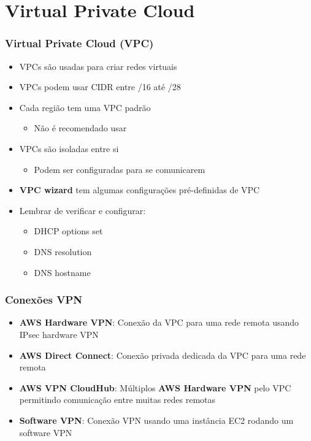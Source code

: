 \section{Virtual Private Cloud}

\begin{frame}
	\frametitle{Virtual Private Cloud (VPC)}
	\begin{itemize}
		\item VPCs são usadas para criar redes virtuais
		\item VPCs podem usar CIDR entre /16 até /28
		\item Cada região tem uma VPC padrão
			\begin{itemize}
				\item Não é recomendado usar
			\end{itemize}
		\item VPCs são isoladas entre si
			\begin{itemize}
				\item Podem ser configuradas para se comunicarem
			\end{itemize}
		\item \textbf{VPC wizard} tem algumas configurações pré-definidas de VPC
		\item Lembrar de verificar e configurar:
		\begin{itemize}
			\item DHCP options set
			\item DNS resolution
			\item DNS hostname
		\end{itemize}
	\end{itemize}
\end{frame}

\begin{frame}
	\frametitle{Conexões VPN}
	\begin{itemize}
		\item \textbf{AWS Hardware VPN}: Conexão da VPC para uma rede remota usando IPsec hardware VPN
		\item \textbf{AWS Direct Connect}: Conexão privada dedicada da VPC para uma rede remota
		\item \textbf{AWS VPN CloudHub}: Múltiplos \textbf{AWS Hardware VPN} pelo VPC permitindo comunicação entre muitas redes remotas
		\item \textbf{Software VPN}: Conexão VPN usando uma instância EC2 rodando um software VPN
	\end{itemize}
\end{frame}

